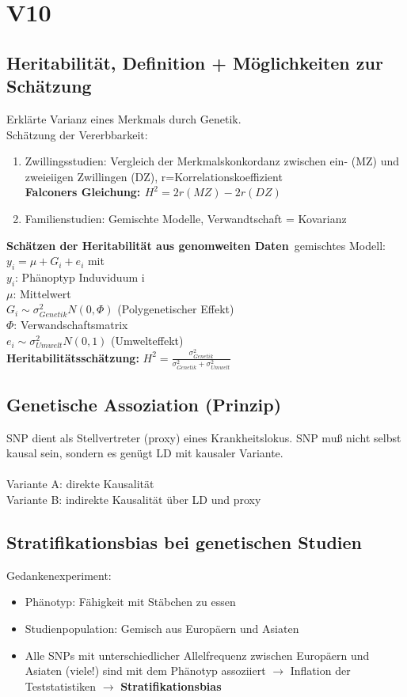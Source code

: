 \section{V10}
\subsection{Heritabilität, Definition + Möglichkeiten zur Schätzung}
Erklärte Varianz eines Merkmals durch Genetik.\\
Schätzung der Vererbbarkeit:
\begin{enumerate}
	\item Zwillingsstudien: Vergleich der Merkmalskonkordanz zwischen ein- (MZ) und zweieiigen Zwillingen (DZ), r=Korrelationskoeffizient\\
	\textbf{Falconers Gleichung: $H^2=2r(MZ)-2r(DZ)$}
	\item Familienstudien: Gemischte Modelle, Verwandtschaft = Kovarianz
\end{enumerate}

\textbf{Schätzen der Heritabilität aus genomweiten Daten}\
gemischtes Modell: $y_i=\mu+G_i+e_i$ mit \\
$y_i$: Phänoptyp Induviduum i\\
$\mu$: Mittelwert\\
$G_i \sim \sigma^{2}_{Genetik}N(0,\Phi)$ (Polygenetischer Effekt)\\
$\Phi$: Verwandschaftsmatrix\\
$e_i \sim \sigma^{2}_{Umwelt}N(0,1)$ (Umwelteffekt)\\

\textbf{Heritabilitätsschätzung:} $H^2=\frac{\sigma^{2}_{Genetik}}{\sigma^{2}_{Genetik} + \sigma^{2}_{Umwelt}}$

\subsection{Genetische Assoziation (Prinzip)}
SNP dient als Stellvertreter (proxy) eines Krankheitslokus. SNP muß nicht selbst kausal sein, sondern es genügt LD mit kausaler Variante.\\\\
Variante A: direkte Kausalität\\
Variante B: indirekte Kausalität über LD und proxy

\subsection{Stratifikationsbias bei genetischen Studien}
Gedankenexperiment:
\begin{itemize}
	\item Phänotyp: Fähigkeit mit Stäbchen zu essen
	\item Studienpopulation: Gemisch aus Europäern und Asiaten
	\item Alle SNPs mit unterschiedlicher Allelfrequenz zwischen Europäern
und Asiaten (viele!) sind mit dem Phänotyp assoziiert $\rightarrow$ Inflation der
Teststatistiken $\rightarrow$ \textbf{Stratifikationsbias}
\end{itemize}

